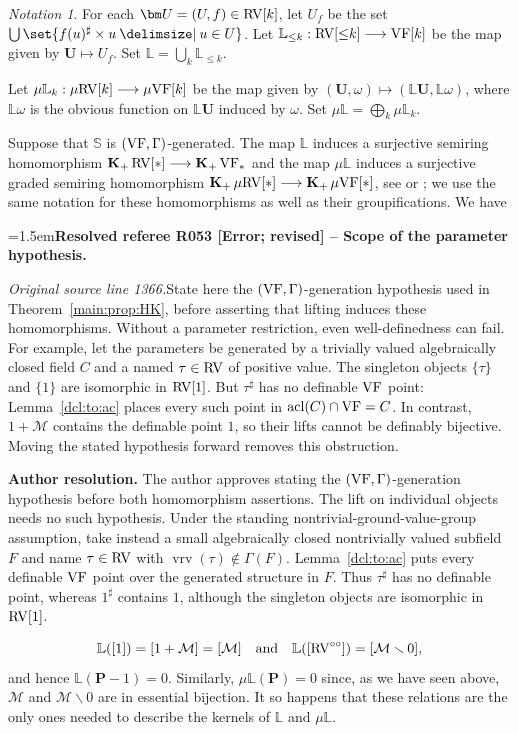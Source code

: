 \documentclass[12pt]{amsart}
\newcommand{\ResolvedRefereeRemark}[5]{%
  \par\medskip\begingroup\normalfont\small\color{gray}%
  \emergencystretch=1.5em\noindent\textbf{Resolved referee R#1 [#2] -- #3.}\par\nobreak\noindent #4\par
  \medskip\color{ResolutionGreen}\noindent\textbf{Author resolution.} #5\par
  \endgroup\medskip
}
\theoremstyle{plain}
\theoremstyle{definition}
\theoremstyle{remark}
\newtheorem{nota}[thm]{Notation}
\numberwithin{equation}{section}
\theoremstyle{plain}
\newcommand{\VF}{\textup{VF}}
\newcommand{\RV}{\textup{RV}}
\newcommand{\MM}{\mdl M}
\DeclareMathOperator{\acl}{acl}
\newcommand{\dand}{\quad \text{and} \quad}
\newcommand{\0}{\emptyset}
\newcommand{\mdl}[1]{\mathcal{#1}}  %
\newcommand{\bb}[1]{\mathbb{#1}}
\newcommand{\fun}{\longrightarrow}
\newcommand{\efun}{\longmapsto}
\newcommand{\mi}{\smallsetminus}
\providecommand\given{}
\newcommand\SetSymbol[1][]{%
\nonscript \: #1 \vert
\allowbreak
\nonscript\:
\mathopen{}}
\renewcommand\given{\SetSymbol[\delimsize]}
\newcommand{\mgVF}{{\mu} {\VF}}
\newcommand{\mgRV}{{\mu}{\RV}}
\newcommand{\mgL}{{\mu}{\bb L}}
\DeclareMathOperator{\gsk}{\mathbf{K}_+}
\DeclareMathOperator{\vrv}{vrv}
\begin{document}
\begin{nota}\label{RVcat:tag}
For each  $\bm U = (U, f) \in  \RV[k]$, let $U_f$ be the set $\bigcup \set{f(u)^\sharp \times u \given u \in U}$. Let $\mathbb{L}_{\leq k}: \RV[{\leq}k] \fun \VF[k]$ be the map  given by $\bm U \efun U_f$. Set $\bb L = \bigcup_k \bb L_{\leq k}$.

Let $\mgL_k: \mgRV[k] \fun \mgVF[k]$ be the map given by $(\bm U, \omega) \efun (\bb L \bm U, \bb L \omega)$, where $\bb L \omega$ is the obvious function on $\bb L \bm U$ induced by $\omega$. Set $\mgL = \bigoplus_k \mgL_{k}$.
\end{nota}

Suppose that $\mathbb S$ is $(\VF,\Gamma)$-generated. The map $\bb L$ induces a surjective semiring homomorphism $\gsk \RV[*] \fun \gsk \VF_*$ and the map $\mgL$ induces a surjective graded semiring homomorphism $\gsk \mgRV[*] \fun \gsk \mgVF[*]$, see \cite[\S~4, \S~6]{hrushovski:kazhdan:integration:vf} or \cite[Corollaries~7.7, 10.6]{Yin:special:trans}; we use the same notation for these homomorphisms as well as their groupifications. We have

\ResolvedRefereeRemark{053}{Error; revised}{Scope of the parameter hypothesis}{%
\textit{Original source line 1366.}\quad State here the $(\VF,\Gamma)$-generation hypothesis used in Theorem~\ref{main:prop:HK}, before asserting that lifting induces these homomorphisms. Without a parameter restriction, even well-definedness can fail. For example, let the parameters be generated by a trivially valued algebraically closed field $C$ and a named $\tau\in\RV$ of positive value. The singleton objects $\{\tau\}$ and $\{1\}$ are isomorphic in $\RV[1]$. But $\tau^\sharp$ has no definable $\VF$ point: Lemma~\ref{dcl:to:ac} places every such point in $\acl(C)\cap\VF=C$. In contrast, $1+\MM$ contains the definable point $1$, so their lifts cannot be definably bijective. Moving the stated hypothesis forward removes this obstruction.
}{The author approves stating the $(\VF,\Gamma)$-generation hypothesis before both homomorphism assertions. The lift on individual objects needs no such hypothesis. Under the standing nontrivial-ground-value-group assumption, take instead a small algebraically closed nontrivially valued subfield $F$ and name $\tau\in\RV$ with $\vrv(\tau)\notin\Gamma(F)$. Lemma~\ref{dcl:to:ac} puts every definable $\VF$ point over the generated structure in $F$. Thus $\tau^\sharp$ has no definable point, whereas $1^\sharp$ contains $1$, although the singleton objects are isomorphic in $\RV[1]$.}
\[
\bb L ([1]) = [1 + \MM] = [\MM] \dand \bb L ([\RV^{\circ\circ}])=[\MM \mi 0],
\]
and hence $\bb L (\bm P - 1)=0$. Similarly, $\mgL (\bm P)=0$ since, as we have seen above, $\MM$ and $\MM \mi 0$ are in essential bijection. It so happens that these relations are the only ones needed to describe the kernels of $\bb L$ and $\mgL$.
\end{document}
